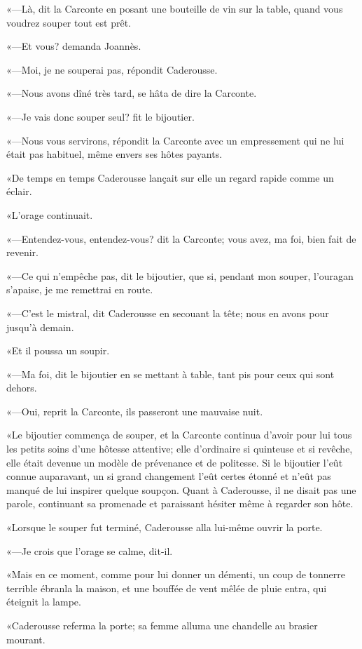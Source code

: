 «—Là, dit la Carconte en posant une bouteille de vin sur la table, quand vous voudrez souper tout est prêt. 

«—Et vous? demanda Joannès. 

«—Moi, je ne souperai pas, répondit Caderousse. 

«—Nous avons dîné très tard, se hâta de dire la Carconte. 

«—Je vais donc souper seul? fit le bijoutier. 

«—Nous vous servirons, répondit la Carconte avec un empressement qui ne lui était pas habituel, même envers ses hôtes payants. 

«De temps en temps Caderousse lançait sur elle un regard rapide comme un éclair. 

«L'orage continuait. 

«—Entendez-vous, entendez-vous? dit la Carconte; vous avez, ma foi, bien fait de revenir. 

«—Ce qui n'empêche pas, dit le bijoutier, que si, pendant mon souper, l'ouragan s'apaise, je me remettrai en route. 

«—C'est le mistral, dit Caderousse en secouant la tête; nous en avons pour jusqu'à demain. 

«Et il poussa un soupir. 

«—Ma foi, dit le bijoutier en se mettant à table, tant pis pour ceux qui sont dehors. 

«—Oui, reprit la Carconte, ils passeront une mauvaise nuit. 

«Le bijoutier commença de souper, et la Carconte continua d'avoir pour lui tous les petits soins d'une hôtesse attentive; elle d'ordinaire si quinteuse et si revêche, elle était devenue un modèle de prévenance et de politesse. Si le bijoutier l'eût connue auparavant, un si grand changement l'eût certes étonné et n'eût pas manqué de lui inspirer quelque soupçon. Quant à Caderousse, il ne disait pas une parole, continuant sa promenade et paraissant hésiter même à regarder son hôte. 

«Lorsque le souper fut terminé, Caderousse alla lui-même ouvrir la porte. 

«—Je crois que l'orage se calme, dit-il. 

«Mais en ce moment, comme pour lui donner un démenti, un coup de tonnerre terrible ébranla la maison, et une bouffée de vent mêlée de pluie entra, qui éteignit la lampe. 

«Caderousse referma la porte; sa femme alluma une chandelle au brasier mourant.  

